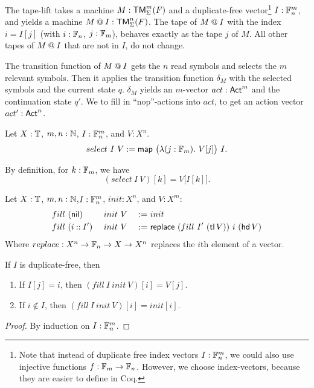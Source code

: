 The tape-lift takes a machine $M:\textsf{TM}_\Sigma^m(F)$ and a duplicate-free vector\footnote{ Note that instead of duplicate free index vectors
  $I:\mathbb{F}_n^m$, we could also use injective functions $f: \mathbb{F}_m \rightarrow \mathbb{F}_n$.  However, we choose index-vectors, because they are easier to define in
  Coq.}  $I: \mathbb{F}_n^m$, and yields a machine $M \mathbin{@} I : \textsf{TM}_\Sigma^n(F)$.  The tape of $M \mathbin{@} I$ with the index $i = I[j]$ (with
$i:\mathbb{F}_n$, $j:\mathbb{F}_m$), behaves exactly as the tape $j$ of $M$. All other tapes of $M \mathbin{@} I$ that are not in $I$, do not change.


The transition function of $M \mathbin{@} I$ gets the $n$ read symbols and selects the $m$ relevant symbols.  Then it applies the transition function
$\delta_M$ with the selected symbols and the current state $q$.  $\delta_M$ yields an $m$-vector $act:\textsf{Act}^m$ and the continuation state $q'$.  We to
fill in ``nop''-actions into $act$, to get an action vector $act':\textsf{Act}^n$.

\begin{definition}
  \label{def:select}
  Let $X:\mathbb{T}$, $m,n:\mathbb{N}$, $I : \mathbb{F}_n^m$, and $V : X^n$.
  \[ select~I~V := \textsf{map}~\bigl(\lambda (j:\mathbb{F}_m).~V[j] \bigr)~I. \]
\end{definition}
\begin{lemma}
  By definition, for $k:\mathbb{F}_m$, we have
  \[
    (select~I~V)[k]=V\bigl[I[k]\bigr].
  \]
\end{lemma}

\begin{definition}
  Let $X:\mathbb{T}$, $m,n:\mathbb{N}$,$I:\mathbb{F}_n^m$, $init:X^n$, and $V:X^m$:
  \begin{alignat*}{3}
    & fill~(\textsf{nil}      )&& ~init~V &~:=~& init \\
    & fill~(i \mathbin{::} I')&& ~init~V &~:=~& \textsf{replace}~(fill~I'~(\operatorname{\textsf{tl}} V))~i~(\operatorname{\textsf{hd}} V)
  \end{alignat*}
  Where $replace : X^n \rightarrow \mathbb{F}_n \rightarrow X \rightarrow X^n$ replaces the $i$th element of a vector.
\end{definition}
\begin{lemma}
  If $I$ is duplicate-free, then
  \begin{enumerate}
  \item \label{lem:fill_correct_nth}
    If $I[j]=i$, then $(fill~I~init~V)[i] = V[j]$.
  \item \label{lem:fill_not_index}
    If $i \notin I$, then $(fill~I~init~V)[i] = init[i]$.
  \end{enumerate}
\end{lemma}
\begin{proof}
  By induction on $I : \mathbb{F}_n^m$.
\end{proof}

